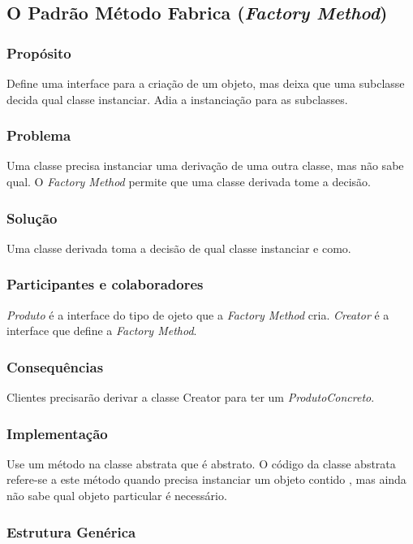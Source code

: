 \subsection{O Padrão Método Fabrica (\textit{Factory Method})}
\subsubsection{Propósito}
Define uma interface para a criação de um objeto, mas deixa que uma subclasse decida qual classe instanciar. Adia a instanciação para as subclasses.

\subsubsection{Problema}
Uma classe precisa instanciar uma derivação de uma outra classe, mas não sabe qual. O \emph{Factory Method} permite que uma classe derivada tome a decisão.

\subsubsection{Solução}
Uma classe derivada toma a decisão de qual classe instanciar e como.

\subsubsection{Participantes e colaboradores}
\emph{Produto} é a interface do tipo de ojeto que a \emph{Factory Method} cria. \emph{Creator} é a interface que define a \emph{Factory Method}.

\subsubsection{Consequências}
Clientes precisarão derivar a classe Creator para ter um \emph{ProdutoConcreto}.

\subsubsection{Implementação}
Use um método na classe abstrata que é abstrato. O código da classe abstrata refere-se a este método quando precisa instanciar um objeto contido , mas ainda não sabe qual objeto particular é necessário.

\subsubsection{Estrutura Genérica}

